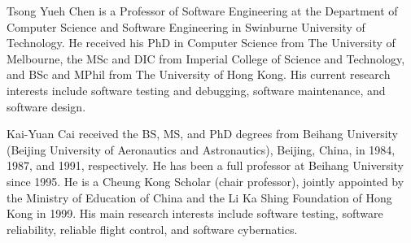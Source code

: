 \documentclass[10pt,journal,compsoc]{IEEEtran}
\begin{document}
\begin{IEEEbiography}{Tsong Yueh Chen} is a Professor of Software Engineering at the Department of Computer Science and Software Engineering in Swinburne University of Technology. He received his PhD in Computer Science from The University of Melbourne, the MSc and DIC from Imperial College of Science and Technology, and BSc and MPhil from The University of Hong Kong. His current research interests include software testing and debugging, software maintenance, and software design.
\end{IEEEbiography}


\begin{IEEEbiography}{Kai-Yuan Cai} received the BS, MS, and PhD degrees from Beihang University (Beijing University of Aeronautics and Astronautics), Beijing, China, in 1984, 1987, and 1991, respectively. He has been a full professor at Beihang University since 1995. He is a Cheung Kong Scholar (chair professor), jointly appointed by the Ministry of Education of China and  the Li Ka Shing Foundation of Hong Kong in 1999. His main research interests include software testing, software reliability, reliable flight control, and software cybernatics.
\end{IEEEbiography}




\ifCLASSOPTIONcaptionsoff
  \newpage
\fi


\end{document}
